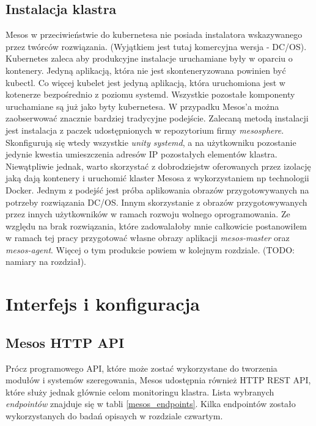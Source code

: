 \documentclass[10pt,a4paper,titlepage,twoside]{report}
\begin{document}
\subsection{Instalacja klastra}
Mesos w przeciwieństwie do kubernetesa nie posiada instalatora wskazywanego przez twórców rozwiązania. (Wyjątkiem jest tutaj komercyjna wersja - DC/OS). Kubernetes zaleca aby produkcyjne instalacje uruchamiane były w oparciu o kontenery. Jedyną aplikacją, która nie jest skonteneryzowana powinien być kubectl. Co więcej kubelet jest jedyną aplikacją, która uruchomiona jest w kotenerze bezpośrednio z poziomu systemd. Wszystkie pozostałe komponenty uruchamiane są już jako byty kubernetesa. W przypadku Mesos'a można zaobserwować znacznie bardziej tradycyjne podejście. Zalecaną metodą instalacji jest instalacja z paczek udostępnionych w repozytorium firmy \textit{mesosphere}. Skonfigurują się wtedy wszystkie \textit{unity systemd}, a na użytkowniku pozostanie jedynie kwestia umieszczenia adresów IP pozostałych elementów klastra. Niewątpliwie jednak, warto skorzystać z dobrodziejstw oferowanych przez izolację jaką dają kontenery i uruchomić klaster Mesosa z wykorzystaniem np technologii Docker. Jednym z podejść jest próba aplikowania obrazów przygotowywanych na potrzeby rozwiązania DC/OS. Innym skorzystanie z obrazów przygotowywanych przez innych użytkowników w ramach rozwoju wolnego oprogramowania. Ze względu na brak rozwiązania, które zadowalałoby mnie całkowicie postanowiłem w ramach tej pracy przygotować własne obrazy aplikacji \textit{mesos-master} oraz \textit{mesos-agent}. Więcej o tym produkcie powiem w kolejnym rozdziale. (TODO: namiary na rozdział).

\section{Interfejs i konfiguracja}
\subsection{Mesos HTTP API}
Prócz programowego API, które może zostać wykorzystane do tworzenia modułów i systemów szeregowania, Mesos udostępnia również HTTP REST API, które służy jednak głównie celom monitoringu klastra. Lista wybranych \textit{endpointów} znajduje się w tabli \ref{mesos_endpoints}.  Kilka endpointów zostało wykorzystanych do badań opisaych w rozdziale czwartym. 
\end{document}

